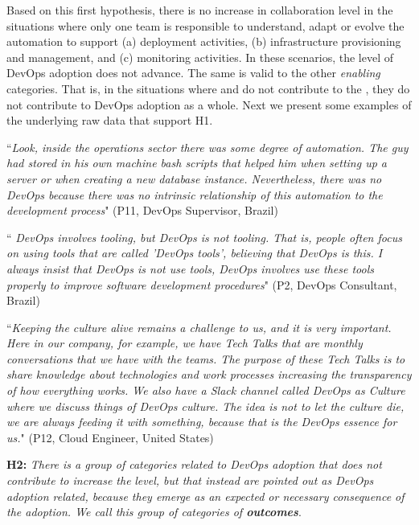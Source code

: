 Based on this first hypothesis, there is no increase in collaboration
level in the situations where only one team is responsible to understand, adapt or
evolve the automation to support (a) deployment activities, (b) infrastructure provisioning and management,
and (c) monitoring activities. In these scenarios, the level of DevOps adoption does not advance.
The same is valid to the other \emph{enabling} categories. That is, in the situations where
 and  do not contribute to
the , they do not contribute to DevOps adoption as a whole. Next
we present some examples of the underlying raw data that support H1.

\begin{mq}
``\emph{Look, inside the operations sector there was some degree of automation. The guy
had stored in his own machine bash scripts that helped him when setting up a
server or when creating a new database instance. Nevertheless, there was no DevOps
because there was no intrinsic relationship of this automation to the
development process}" (P11, DevOps Supervisor, Brazil)
\end{mq}


\begin{mq}
``\emph{
DevOps involves tooling, but DevOps is not tooling. That is, people often
focus on using tools that are called 'DevOps tools', believing that DevOps is
this. I always insist that DevOps is not use tools, DevOps involves use these
tools properly to improve software development procedures}" (P2, DevOps
Consultant, Brazil)
\end{mq}


\begin{mq}
``\emph{Keeping the culture alive remains a challenge to us, and it is very
important. Here in our company, for example, we have Tech Talks that are
monthly conversations that we have with the teams. The purpose of these Tech
Talks is to share knowledge about technologies and work processes increasing the
transparency of how everything works. We also have a Slack channel called
DevOps as Culture where we discuss things of DevOps culture. The idea is not to
let the culture die, we are always feeding it with something, because that is
the DevOps essence for us.}" (P12, Cloud Engineer, United States)
\end{mq}

\begin{mh}
\textbf{H2:} \textit{There is a group of categories related to DevOps adoption
that does not contribute to increase the}  \emph{level, but that instead are
pointed out as DevOps adoption related, because they emerge as an expected or
necessary consequence of the adoption. We call this group of categories of
\textbf{outcomes}}.
\end{mh}

